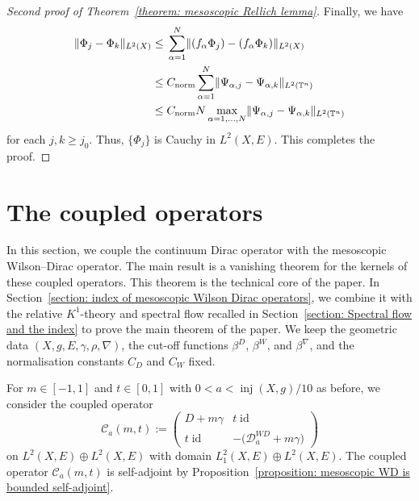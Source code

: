 \documentclass[a4paper,oneside,12pt]{amsart}
\theoremstyle{plain}
\theoremstyle{definition}
\theoremstyle{remark}
\DeclarePairedDelimiter{\norm}{\lVert}{\rVert}
\DeclareMathOperator{\id}{id}
\DeclareMathOperator{\injectivityradius}{inj}
\newcommand{\flattorus}{\mathbb{T}^n}
\newcommand{\cliffordmultiplication}{\rho}
\newcommand{\Ltwonorm}[2][L^2]{\norm{#2}_{#1}}
\newcommand{\mesoscopicWilsonDiracoperator}[1][a]{\mathcal{D}_{#1}^{\mathit{WD}}}
\newcommand{\cutoff}{\beta}
\newcommand{\cutoffDirac}{\cutoff^D}
\newcommand{\cutoffWilson}{\cutoff^W}
\newcommand{\cutoffnabla}{\cutoff^{\nabla}}
\newcommand{\coupledoperator}[3][a]{\mathcal{C}_{#1}(#2,#3)}
\newcommand{\constantLtwonorm}{C_{\mathrm{norm}}}
\begin{document}
\begin{proof}[Second proof of Theorem~\ref{theorem: mesoscopic Rellich lemma}]
  Finally, we have
  \begin{equation}
    \begin{aligned}
    \Ltwonorm[L^2(X)]{\Phi_j - \Phi_k} \le{}& \sum_{\alpha=1}^N \Ltwonorm[L^2(X)]{(f_{\alpha}\Phi_j) - (f_{\alpha}\Phi_k)} \\
    \le{}& \constantLtwonorm \sum_{\alpha=1}^N \Ltwonorm[L^2(\flattorus)]{\Psi_{\alpha,j} - \Psi_{\alpha,k}} \\
    \le{}& \constantLtwonorm N \max_{\alpha=1,\dots,N}\Ltwonorm[L^2(\flattorus)]{\Psi_{\alpha,j} - \Psi_{\alpha,k}}
    \end{aligned}
  \end{equation}
  for each $j,k \ge j_0$.
  Thus, $\{\Phi_j\}$ is Cauchy in $L^2(X,E)$.
  This completes the proof.
\end{proof}

\section{The coupled operators}\label{section: the coupled operators}

In this section, we couple the continuum Dirac operator with the mesoscopic Wilson--Dirac operator.
The main result is a vanishing theorem for the kernels of these coupled operators.
This theorem is the technical core of the paper.
In Section~\ref{section: index of mesoscopic Wilson Dirac operators}, we combine it with the relative $K^1$-theory and spectral flow recalled in Section~\ref{section: Spectral flow and the index} to prove the main theorem of the paper.
We keep the geometric data $(X,g,E,\gamma,\cliffordmultiplication,\nabla)$, the cut-off functions $\cutoffDirac$, $\cutoffWilson$, and $\cutoffnabla$, and the normalisation constants $C_D$ and $C_W$ fixed.

For $m\in[-1,1]$ and $t\in[0,1]$ with $0<a<\injectivityradius(X,g)/10$ as before, we consider the coupled operator
\begin{equation}
  \coupledoperator{m}{t} := \begin{pmatrix}
    D+m\gamma & t \id \\
    t \id & -\bigl(\mesoscopicWilsonDiracoperator + m\gamma\bigr)
  \end{pmatrix}
\end{equation}
on $L^2(X,E) \oplus L^2(X,E)$ with domain $L^2_1(X,E) \oplus L^2(X,E)$.
The coupled operator $\coupledoperator{m}{t}$ is self-adjoint by Proposition~\ref{proposition: mesoscopic WD is bounded self-adjoint}.
\end{document}
